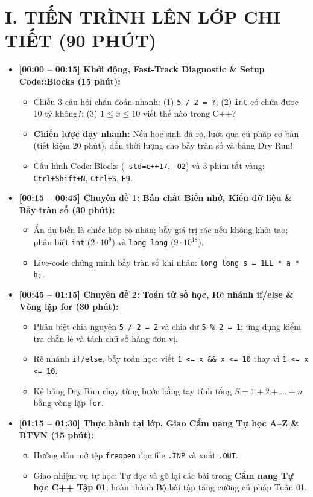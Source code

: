 \documentclass[11pt,a4paper]{article}
\begin{document}
\section*{\color{AsianDarkBlue}I. TIẾN TRÌNH LÊN LỚP CHI TIẾT (90 PHÚT)}
\begin{itemize}
    \setlength{\itemsep}{2pt}
    \item \textbf{[00:00 -- 00:15] Khởi động, Fast-Track Diagnostic \& Setup Code::Blocks (15 phút):}
    \begin{itemize}
        \item Chiếu 3 câu hỏi chẩn đoán nhanh: (1) \texttt{5 / 2 = ?}; (2) \texttt{int} có chứa được 10 tỷ không?; (3) $1 \le x \le 10$ viết thế nào trong C++?
        \item \textbf{Chiến lược dạy nhanh:} Nếu học sinh đã rõ, lướt qua cú pháp cơ bản (tiết kiệm 20 phút), dồn thời lượng cho bẫy tràn số và bảng Dry Run!
        \item Cấu hình Code::Blocks (\texttt{-std=c++17}, \texttt{-O2}) và 3 phím tắt vàng: \texttt{Ctrl+Shift+N}, \texttt{Ctrl+S}, \texttt{F9}.
    \end{itemize}
    \item \textbf{[00:15 -- 00:45] Chuyên đề 1: Bản chất Biến nhớ, Kiểu dữ liệu \& Bẫy tràn số (30 phút):}
    \begin{itemize}
        \item Ẩn dụ biến là chiếc hộp có nhãn; bẫy giá trị rác nếu không khởi tạo; phân biệt \texttt{int} ($2 \cdot 10^9$) và \texttt{long long} ($9 \cdot 10^{18}$).
        \item Live-code chứng minh bẫy tràn số khi nhân: \texttt{long long s = 1LL * a * b;}.
    \end{itemize}
    \item \textbf{[00:45 -- 01:15] Chuyên đề 2: Toán tử số học, Rẽ nhánh if/else \& Vòng lặp for (30 phút):}
    \begin{itemize}
        \item Phân biệt chia nguyên \texttt{5 / 2 = 2} và chia dư \texttt{5 \% 2 = 1}; ứng dụng kiểm tra chẵn lẻ và tách chữ số hàng đơn vị.
        \item Rẽ nhánh \texttt{if/else}, bẫy toán học: viết \texttt{1 <= x \&\& x <= 10} thay vì \texttt{1 <= x <= 10}.
        \item Kẻ bảng Dry Run chạy từng bước bằng tay tính tổng $S = 1 + 2 + \dots + n$ bằng vòng lặp \texttt{for}.
    \end{itemize}
    \item \textbf{[01:15 -- 01:30] Thực hành tại lớp, Giao Cẩm nang Tự học A--Z \& BTVN (15 phút):}
    \begin{itemize}
        \item Hướng dẫn mở tệp \texttt{freopen} đọc file \texttt{.INP} và xuất \texttt{.OUT}.
        \item Giao nhiệm vụ tự học: Tự đọc và gõ lại các bài trong \textbf{Cẩm nang Tự học C++ Tập 01}; hoàn thành Bộ bài tập tăng cường cú pháp Tuần 01.
    \end{itemize}
\end{itemize}
\end{document}

